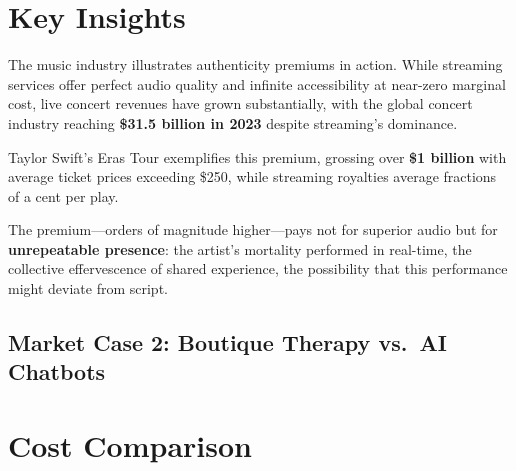 \documentclass[
  a4paper,
]{report}
\begin{document}
\section{Key Insights}

The music industry illustrates authenticity premiums in action. While
streaming services offer perfect audio quality and infinite
accessibility at near-zero marginal cost, live concert revenues have
grown substantially, with the global concert industry reaching
\textbf{\$31.5 billion in 2023} despite streaming's dominance.

Taylor Swift's Eras Tour exemplifies this premium, grossing over
\textbf{\$1 billion} with average ticket prices exceeding \$250, while
streaming royalties average fractions of a cent per play.

The premium---orders of magnitude higher---pays not for superior audio
but for \textbf{unrepeatable presence}: the artist's mortality performed
in real-time, the collective effervescence of shared experience, the
possibility that this performance might deviate from script.

\subsection{Market Case 2: Boutique Therapy vs.~AI
Chatbots}\label{market-case-2-boutique-therapy-vs.-ai-chatbots}

\section{Cost Comparison}
\end{document}

